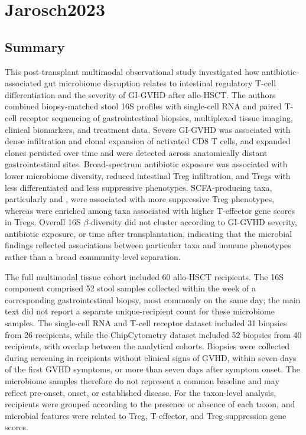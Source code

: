 \documentclass[11pt,a4paper]{article}
\begin{document}
\section{Jarosch2023}
\subsection{Summary}

This post-transplant multimodal observational study investigated how antibiotic-associated gut microbiome disruption relates to intestinal regulatory T-cell differentiation and the severity of GI-GVHD after allo-HSCT. The authors combined biopsy-matched stool 16S profiles with single-cell RNA and paired T-cell receptor sequencing of gastrointestinal biopsies, multiplexed tissue imaging, clinical biomarkers, and treatment data. Severe GI-GVHD was associated with dense infiltration and clonal expansion of activated CD8 T cells, and expanded clones persisted over time and were detected across anatomically distant gastrointestinal sites. Broad-spectrum antibiotic exposure was associated with lower microbiome diversity, reduced intestinal Treg infiltration, and Tregs with less differentiated and less suppressive phenotypes. SCFA-producing taxa, particularly \taxClostridia and \taxBacteroidia, were associated with more suppressive Treg phenotypes, whereas \taxGammaproteobacteria were enriched among taxa associated with higher T-effector gene scores in Tregs. Overall 16S $\beta$-diversity did not cluster according to GI-GVHD severity, antibiotic exposure, or time after transplantation, indicating that the microbial findings reflected associations between particular taxa and immune phenotypes rather than a broad community-level separation. 
\par

The full multimodal tissue cohort included 60 allo-HSCT recipients. The 16S component comprised 52 stool samples collected within the week of a corresponding gastrointestinal biopsy, most commonly on the same day; the main text did not report a separate unique-recipient count for these microbiome samples. The single-cell RNA and T-cell receptor dataset included 31 biopsies from 26 recipients, while the ChipCytometry dataset included 52 biopsies from 40 recipients, with overlap between the analytical cohorts. Biopsies were collected during screening in recipients without clinical signs of GVHD, within seven days of the first GVHD symptoms, or more than seven days after symptom onset. The microbiome samples therefore do not represent a common baseline and may reflect pre-onset, onset, or established disease. For the taxon-level analysis, recipients were grouped according to the presence or absence of each taxon, and microbial features were related to Treg, T-effector, and Treg-suppression gene scores.
\par
\end{document}
